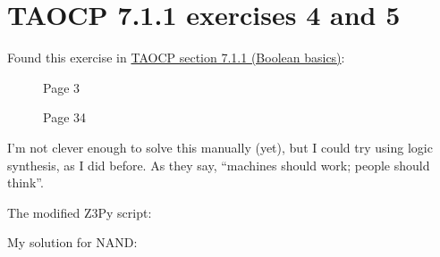 \section{TAOCP 7.1.1 exercises 4 and 5}

Found this exercise in \href{http://www.cs.utsa.edu/~wagner/knuth/fasc0b.pdf}{TAOCP section 7.1.1 (Boolean basics)}:

\begin{figure}[H]
\centering
{}
\caption{Page 3}
\end{figure}

\begin{figure}[H]
\centering
{}
\caption{Page 34}
\end{figure}

I'm not clever enough to solve this manually (yet),
but I could try using logic synthesis, as I did before.
As they say, ``machines should work; people should think''.

The modified Z3Py script:



My solution for NAND:

